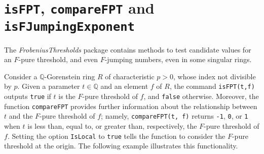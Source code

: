 \documentclass{amsart}
\begin{document}
%
%

\section{{\tt isFPT}, {\tt compareFPT} and {\tt isFJumpingExponent}}
\label{sec.IsFPT}

The \emph{FrobeniusThresholds} package contains methods to
 test candidate values for an $F$-pure threshold, and even $F$-jumping numbers, even in some singular rings.

Consider a  $\mathbb{Q}$-Gorenstein ring $R$ of characteristic $p>0$, whose index not divisible by $p$.
Given a parameter $t \in \mathbb{Q}$ and an element $f$ of $R$, the command {\tt isFPT(t,f)} outputs {\tt true} if $t$ is the $F$-pure threshold of $f$, and {\tt false} otherwise.
Moreover, the function {\tt compareFPT} provides further information about the relationship between $t$ and the $F$-pure threshold of $f$; namely,
{\tt compareFPT(t, f)} returns {\tt-1}, {\tt 0}, or {\tt 1} when $t$ is less than, equal to, or greater than, respectively, the $F$-pure threshold of $f$.  Setting the option {\tt IsLocal} to {\tt true} tells the function to consider the $F$-pure threshold at the origin.  The following example illustrates this functionality.
\end{document}
